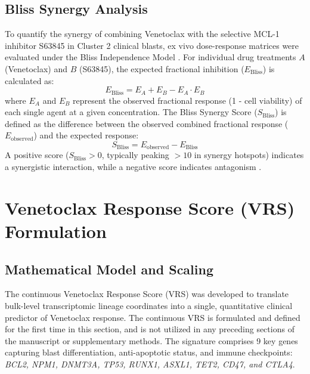\documentclass[11pt,a4paper]{article}
\begin{document}
\subsection{Bliss Synergy Analysis}
To quantify the synergy of combining Venetoclax with the selective MCL-1 inhibitor S63845 in Cluster 2 clinical blasts, ex vivo dose-response matrices were evaluated under the Bliss Independence Model \cite{bliss1939toxicity,greco1995search,foucquier2015analysis}. For individual drug treatments $A$ (Venetoclax) and $B$ (S63845), the expected fractional inhibition ($E_{\text{Bliss}}$) is calculated as:
\begin{equation}
E_{\text{Bliss}} = E_A + E_B - E_A \cdot E_B
\end{equation}
where $E_A$ and $E_B$ represent the observed fractional response (1 - cell viability) of each single agent at a given concentration. The Bliss Synergy Score ($S_{\text{Bliss}}$) is defined as the difference between the observed combined fractional response ($E_{\text{observed}}$) and the expected response:
\begin{equation}
S_{\text{Bliss}} = E_{\text{observed}} - E_{\text{Bliss}}
\end{equation}
A positive score ($S_{\text{Bliss}} > 0$, typically peaking $> 10$ in synergy hotspots) indicates a synergistic interaction, while a negative score indicates antagonism \cite{ianevski2017synergyfinder}.

\section{Venetoclax Response Score (VRS) Formulation}

\subsection{Mathematical Model and Scaling}
The continuous Venetoclax Response Score (VRS) was developed to translate bulk-level transcriptomic lineage coordinates into a single, quantitative clinical predictor of Venetoclax response. The continuous VRS is formulated and defined for the first time in this section, and is not utilized in any preceding sections of the manuscript or supplementary methods. The signature comprises 9 key genes capturing blast differentiation, anti-apoptotic status, and immune checkpoints: \textit{BCL2, NPM1, DNMT3A, TP53, RUNX1, ASXL1, TET2, CD47, and CTLA4}.
\end{document}
